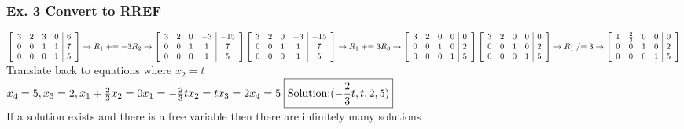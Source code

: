 \documentclass{article}
\begin{document}
\subsubsection*{Ex. 3 Convert to RREF}
$
\left[\begin{array}{cccc|c}
3 & 2 & 3 & 0 & 6 \\
0 & 0 & 1 & 1 & 7 \\
0 & 0 & 0 & 1 & 5
\end{array}\right] \rightarrow R_1 \mathrel{+}= -3R_2 \rightarrow
\left[\begin{array}{cccc|c}
3 & 2 & 0 & -3 & -15 \\
0 & 0 & 1 & 1 & 7 \\
0 & 0 & 0 & 1 & 5
\end{array}\right] \\ [0.1in]
\left[\begin{array}{cccc|c}
3 & 2 & 0 & -3 & -15 \\
0 & 0 & 1 & 1 & 7 \\
0 & 0 & 0 & 1 & 5
\end{array}\right]  \rightarrow R_1 \mathrel{+}= 3R_3 \rightarrow
\left[\begin{array}{cccc|c}
3 & 2 & 0 & 0 & 0 \\
0 & 0 & 1 & 0 & 2 \\
0 & 0 & 0 & 1 & 5
\end{array}\right] \\[0.1in]
\left[\begin{array}{cccc|c}
3 & 2 & 0 & 0 & 0 \\
0 & 0 & 1 & 0 & 2 \\
0 & 0 & 0 & 1 & 5
\end{array}\right]
 \rightarrow R_1 \mathrel{/}= 3 \rightarrow \left[\begin{array}{cccc|c}
1 & \frac{2}{3} & 0 & 0 & 0 \\
0 & 0 & 1 & 0 & 2 \\
0 & 0 & 0 & 1 & 5
\end{array}\right] 
$
\\Translate back to equations where $x_2=t$\\
$x_4 = 5, x_3=2, x_1+\frac{2}{3}x_2=0 \\ x_1 = -\frac{2}{3}t\\x_2=t\\x_3=2\\x_4=5 \; \boxed{\text{Solution:} (-\frac{2}{3}t, t, 2, 5) }$
\\If a solution exists and there is a free variable then there are infinitely many solutions 
\end{document}
